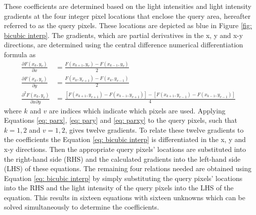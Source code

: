 \documentclass[12pt,oneside,openany,a4paper, %
english, %
masters-t, goldenblock]{usthesis}
\begin{document}
These coefficients are determined based on the light intensities and light intensity gradients at the four integer pixel locations that enclose the query area, hereafter referred to as the query pixels. These locations are depicted as blue in Figure \ref{fig: bicubic interp}. The gradients, which are partial derivatives in the x, y and x-y directions, are determined using the central difference numerical differentiation formula as \cite{gilat2004matlab}
\begin{align}
  \frac{\partial F(x_k,y_v)}{\partial x} &= \frac{F(x_{k+1},y_v)-F(x_{k-1},y_v)}{2} 
  \label{eq: parx}\\
  \frac{\partial F(x_k,y_v)}{\partial y} &= \frac{F(x_{k},y_{v+1})-F(x_{k},y_{v-1})}{2} 
  \label{eq: pary} \\
  \frac{\partial^2 F(x_k,y_v)}{\partial x \partial y} &= \frac{\left[ F(x_{k+1},y_{v+1})-F(x_{k-1},y_{v+1}) \right] - \left[ F(x_{k+1},y_{v-1})-F(x_{k-1},y_{v-1}) \right]}{4} \label{eq: parxy}
\end{align}
where $k$ and $v$ are indices which indicate which pixels are used. Applying Equations \ref{eq: parx}, \ref{eq: pary} and \ref{eq: parxy} to the query pixels, such that $k=1,2$ and $v=1,2$, gives twelve gradients. To relate these twelve gradients to the coefficients the Equation \ref{eq: bicubic interp} is differentiated in the x, y and x-y directions. Then the appropriate query pixels' locations are substituted into the right-hand side (RHS) and the calculated gradients into the left-hand side (LHS) of these equations. The remaining four relations needed are obtained using Equation \ref{eq: bicubic interp} by simply substituting the query pixels' locations into the RHS and the light intensity of the query pixels into the LHS of the equation. This results in sixteen equations with sixteen unknowns which can be solved simultaneously to determine the coefficients.
\end{document}
